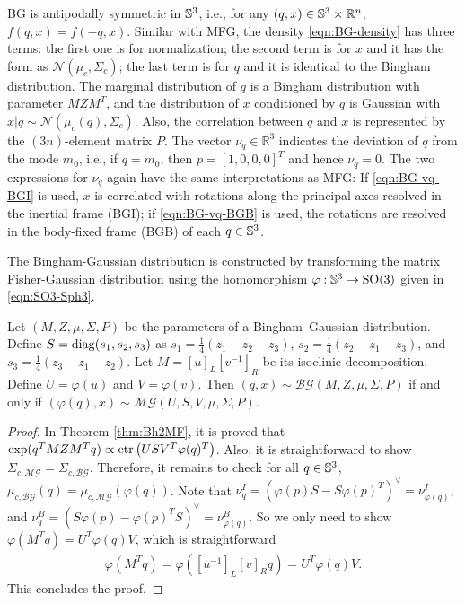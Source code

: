 BG is antipodally symmetric in $\mathbb{S}^3$, i.e., for any $(q,x)\in\mathbb{S}^3\times\mathbb{R}^n$, $f(q,x) = f(-q,x)$.
Similar with MFG, the density \eqref{eqn:BG-density} has three terms:
the first one is for normalization; the second term is for $x$ and it has the form as $\mathcal{N}(\mu_c, \Sigma_c)$; the last term is for $q$ and it is identical to the Bingham distribution.
The marginal distribution of $q$ is a Bingham distribution with parameter $MZM^T$, and the distribution of $x$ conditioned by $q$ is Gaussian with $x|q\sim\mathcal{N}(\mu_c(q), \Sigma_c)$.
Also, the correlation between $q$ and $x$ is represented by the $(3n)$-element matrix $P$.
The vector $\nu_q\in\mathbb{R}^3$ indicates the deviation of $q$ from the mode $m_0$, i.e., if $q=m_0$, then $p = [1,0,0,0]^T$ and hence $\nu_q = 0$.
The two expressions for $\nu_q$ again have the same interpretations as MFG:
If \eqref{eqn:BG-vq-BGI} is used, $x$ is correlated with rotations along the principal axes resolved in the inertial frame (BGI);
if \eqref{eqn:BG-vq-BGB} is used, the rotations are resolved in the body-fixed frame (BGB) of each $q\in\mathbb{S}^3$.

The Bingham-Gaussian distribution is constructed by transforming the matrix Fisher-Gaussian distribution using the homomorphism $\varphi: \mathbb{S}^3\to\mathrm{SO}(3)$ given in \eqref{eqn:SO3-Sph3}.
\begin{theorem} \label{thm:BG-MFG}
	Let $(M,Z,\mu,\Sigma,P)$ be the parameters of a Bingham--Gaussian distribution.
	Define $S = \mathrm{diag}(s_1,s_2,s_3)$ as $s_1 = \tfrac{1}{4}(z_1-z_2-z_3)$, $s_2 = \tfrac{1}{4}(z_2-z_1-z_3)$, and $s_3 = \tfrac{1}{4}(z_3-z_1-z_2)$.
	Let $M = [u]_L[v^{-1}]_R$ be its isoclinic decomposition.
	Define $U = \varphi(u)$ and $V = \varphi(v)$.
	Then $(q,x)\sim\mathcal{BG}(M,Z,\mu,\Sigma,P)$ if and only if $(\varphi(q),x)\sim\mathcal{MG}(U,S,V,\mu,\Sigma,P)$.
\end{theorem}
\begin{proof}
	In Theorem \ref{thm:Bh2MF}, it is proved that $\exp(q^TMZM^Tq) \propto \mathrm{etr}\left( USV^T\varphi(q)^T \right)$.
	Also, it is straightforward to show $\Sigma_{c,\mathcal{MG}} = \Sigma_{c,\mathcal{BG}}$.
	Therefore, it remains to check for all $q\in\mathbb{S}^3$, $\mu_{c,\mathcal{BG}}(q) = \mu_{c,\mathcal{MG}}(\varphi(q))$.
	Note that $\nu_q^I = \allowbreak (\varphi(p)S-S\varphi(p)^T)^\vee = \allowbreak \nu_{\varphi(q)}^I$, and $\nu_q^B = \allowbreak (S\varphi(p)-\varphi(p)^TS)^\vee = \allowbreak \nu_{\varphi(q)}^B$.
	So we only need to show $\varphi(M^Tq) = U^T\varphi(q)V$, which is straightforward
	\begin{align*}
		\varphi(M^Tq) = \varphi([u^{-1}]_L[v]_Rq) = U^T\varphi(q)V.
	\end{align*}
	This concludes the proof.
\end{proof}

